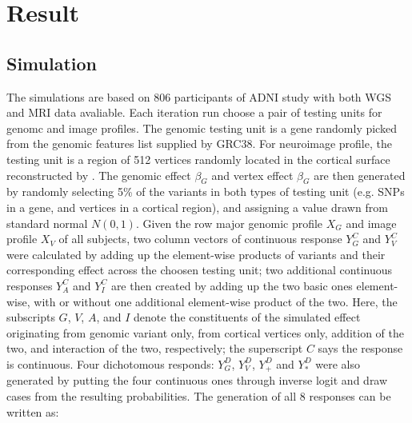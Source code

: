\section{Result}
\subsection{Simulation}
The simulations are based on 806 participants of ADNI study with both WGS and MRI data avaliable. Each iteration run choose a pair of testing units for genomc and image profiles. The genomic testing unit is a gene randomly picked from the genomic features list supplied by GRC38. For neuroimage profile, the testing unit is a region of 512 vertices randomly located in the cortical surface reconstructed by \FS. The genomic effect $\beta_G$ and vertex effect $\beta_G$ are then generated by randomly selecting 5\% of the variants in both types of testing unit (e.g. SNPs in a gene, and vertices in a cortical region), and assigning a value drawn from standard normal $N(0,1)$. Given the row major genomic profile $X_G$ and image profile $X_V$ of all subjects, two column vectors of continuous response $Y_G^C$ and $Y_V^C$ were calculated by adding up the element-wise products of variants and their corresponding effect across the choosen testing unit; two additional continuous responses $Y_A^C$ and $Y_I^C$ are then created by adding up the two basic ones element-wise, with or without one additional element-wise product of the two. Here, the subscripts $G$, $V$, $A$, and $I$ denote the constituents of the simulated effect originating from genomic variant only, from cortical vertices only, addition of the two, and interaction of the two, respectively; the superscript $C$ says the response is continuous. Four dichotomous responds: $Y_G^D$, $Y_V^D$, $Y_+^D$ and $Y_*^D$ were also generated by putting the four continuous ones through inverse logit and draw cases from the resulting probabilities. The generation of all 8 responses can be written as:


